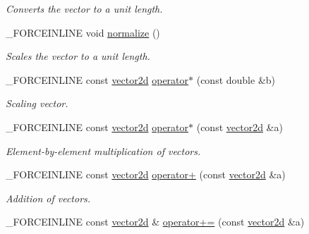 \begin{DoxyCompactItemize}
\begin{DoxyCompactList}\small\item\em Converts the vector to a unit length. \end{DoxyCompactList}\item 
\hypertarget{classbt_1_1vector2d_a59c6a746dbb1b2304e19f76f0b37e003}{\-\_\-\-F\-O\-R\-C\-E\-I\-N\-L\-I\-N\-E void \hyperlink{classbt_1_1vector2d_a59c6a746dbb1b2304e19f76f0b37e003}{normalize} ()}\label{classbt_1_1vector2d_a59c6a746dbb1b2304e19f76f0b37e003}

\begin{DoxyCompactList}\small\item\em Scales the vector to a unit length. \end{DoxyCompactList}\item 
\hypertarget{classbt_1_1vector2d_aa088139fdc796f202aa71e88bbe0903b}{\-\_\-\-F\-O\-R\-C\-E\-I\-N\-L\-I\-N\-E const \hyperlink{classbt_1_1vector2d}{vector2d} \hyperlink{classbt_1_1vector2d_aa088139fdc796f202aa71e88bbe0903b}{operator$\ast$} (const double \&b)}\label{classbt_1_1vector2d_aa088139fdc796f202aa71e88bbe0903b}

\begin{DoxyCompactList}\small\item\em Scaling vector. \end{DoxyCompactList}\item 
\hypertarget{classbt_1_1vector2d_ae0946c47f138f2671ec9f3010ec5cc36}{\-\_\-\-F\-O\-R\-C\-E\-I\-N\-L\-I\-N\-E const \hyperlink{classbt_1_1vector2d}{vector2d} \hyperlink{classbt_1_1vector2d_ae0946c47f138f2671ec9f3010ec5cc36}{operator$\ast$} (const \hyperlink{classbt_1_1vector2d}{vector2d} \&a)}\label{classbt_1_1vector2d_ae0946c47f138f2671ec9f3010ec5cc36}

\begin{DoxyCompactList}\small\item\em Element-\/by-\/element multiplication of vectors. \end{DoxyCompactList}\item 
\hypertarget{classbt_1_1vector2d_a10e66ab477266a85d0e32917093458aa}{\-\_\-\-F\-O\-R\-C\-E\-I\-N\-L\-I\-N\-E const \hyperlink{classbt_1_1vector2d}{vector2d} \hyperlink{classbt_1_1vector2d_a10e66ab477266a85d0e32917093458aa}{operator+} (const \hyperlink{classbt_1_1vector2d}{vector2d} \&a)}\label{classbt_1_1vector2d_a10e66ab477266a85d0e32917093458aa}

\begin{DoxyCompactList}\small\item\em Addition of vectors. \end{DoxyCompactList}\item 
\hypertarget{classbt_1_1vector2d_a4d00021a9032f2f482ecce3f0f1492be}{\-\_\-\-F\-O\-R\-C\-E\-I\-N\-L\-I\-N\-E const \hyperlink{classbt_1_1vector2d}{vector2d} \& \hyperlink{classbt_1_1vector2d_a4d00021a9032f2f482ecce3f0f1492be}{operator+=} (const \hyperlink{classbt_1_1vector2d}{vector2d} \&a)}\label{classbt_1_1vector2d_a4d00021a9032f2f482ecce3f0f1492be}


\end{DoxyCompactItemize}

